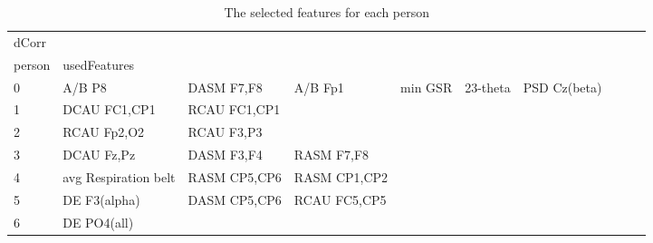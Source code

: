 \begin{landscape}
\begin{table}[]
\centering
\caption{The selected features for each person}
\begin{tabular}{l|llllllll}
dCorr    &                       &                       &                      &                         &                         &                      &                      &                       &                       &                    \\
person   & usedFeatures          &                       &                      &                         &                         &                      &                      &                       &                       &                    \\
0        & A/B P8                & DASM F7,F8            & A/B Fp1              & min GSR                 & 23-theta                & PSD Cz(beta)         &                      &                       &                       &                    \\
1        & DCAU FC1,CP1          & RCAU FC1,CP1          &                      &                         &                         &                      &                      &                       &                       &                    \\
2        & RCAU Fp2,O2           & RCAU F3,P3            &                      &                         &                         &                      &                      &                       &                       &                    \\
3        & DCAU Fz,Pz            & DASM F3,F4            & RASM F7,F8           &                         &                         &                      &                      &                       &                       &                    \\
4        & avg Respiration belt  & RASM CP5,CP6          & RASM CP1,CP2         &                         &                         &                      &                      &                       &                       &                    \\
5        & DE F3(alpha)          & DASM CP5,CP6          & RCAU FC5,CP5         &                         &                         &                      &                      &                       &                       &                    \\
6        & DE PO4(all)           &                       &                      &                         &                         &                      &                      &                       &                       &                    \\

\end{tabular}
\end{table}
\end{landscape}
